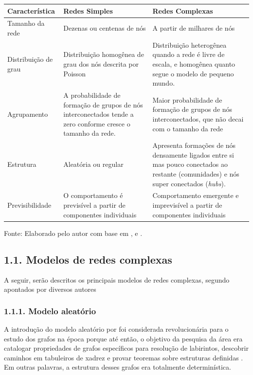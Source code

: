 \documentclass[12pt,oneside,a4paper,brazil,sumario=tradicional]{abntex2}
\begin{document}
\begin{center}
\begin{tabular}{p{4cm}|p{4cm}|p{4cm}}
\toprule
\textbf{Característica} & \textbf{Redes Simples} & \textbf{Redes Complexas} \\
\midrule
Tamanho da rede & Dezenas ou centenas de nós & A partir de milhares de nós \\
Distribuição de grau & Distribuição homogênea de grau dos nós descrita por Poisson & Distribuição heterogênea quando a rede é livre de escala, e homogênea quanto segue o modelo de pequeno mundo. \\
Agrupamento & A probabilidade de formação de grupos de nós interconectados tende a zero conforme cresce o tamanho da rede. & Maior probabilidade de formação de grupos de nós interconectados, que não decai com o tamanho da rede \\
Estrutura & Aleatória ou regular & Apresenta formações de nós densamente ligados entre si mas pouco conectados ao restante (comunidades) e nós super conectados (\textit{hubs}). \\
Previsibilidade & O comportamento é previsível a partir de componentes individuais & Comportamento emergente e imprevisível a partir de componentes individuais \\
\bottomrule
\end{tabular}
\end{center}
Fonte: Elaborado pelo autor com base em ,  e .

\subsection*{1.1. Modelos de redes complexas}
A seguir, serão descritos os principais modelos de redes complexas, segundo apontados por diversos autores \cite{barabasi2002, newman2010, latora2017}

\subsubsection*{1.1.1. Modelo aleatório}
A introdução do modelo aleatório por  foi considerada revolucionária para o estudo dos grafos na época porque até então, o objetivo da pesquisa da área era catalogar propriedades de grafos específicos para resolução de labirintos, descobrir  caminhos em tabuleiros de xadrez e provar teoremas sobre estruturas definidas \cite{barabasi2002}. Em outras palavras, a estrutura desses grafos era totalmente determinística.
\end{document}
